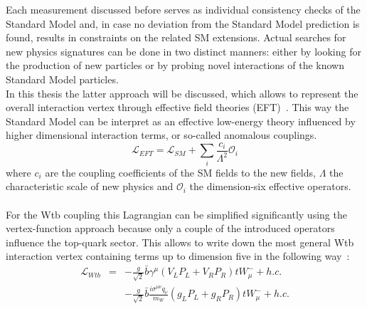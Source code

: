 Each measurement discussed before serves as individual consistency checks of the Standard Model and, in case no deviation from the Standard Model prediction is found, results in constraints on the related SM extensions.
Actual searches for new physics signatures can be done in two distinct manners: either by looking for the production of new particles or by probing novel interactions of the known Standard Model particles.
\\
In this thesis the latter approach will be discussed, which allows to represent the overall interaction vertex through effective field theories (EFT)~\cite{EFTOld}. This way the Standard Model can be interpret as an effective low-energy theory influenced by higher dimensional interaction terms, or so-called anomalous couplings.
\begin{equation}
 \mathcal{L}_{EFT} = \mathcal{L}_{SM} + \sum_{i} \frac{c_i}{\Lambda^{2}} \mathcal{O}_i
\end{equation}
where $c_i$ are the coupling coefficients of the SM fields to the new fields, $\Lambda$ the characteristic scale of new physics and $\mathcal{O}_i$ the dimension-six effective operators.
\\
\\
For the Wtb coupling this Lagrangian can be simplified significantly using the vertex-function approach because only a couple of the introduced operators influence the top-quark sector.
This allows to write down the most general Wtb interaction vertex containing terms up to dimension five in the following way~\cite{EFTLinkWithWtb, RecentWtbZhang}:
\begin{eqnarray} \label{eq::FullWtbLagr}
  \mathcal{L}_{Wtb} & = & - \frac{g}{\sqrt{2}} \bar{b} \gamma^{\mu} \left( V_L P_L + V_R P_R \right) t W_{\mu}^{-} + h.c. \nonumber \\
		    &   & - \frac{g}{\sqrt{2}} \bar{b} \frac{i\sigma^{\mu \nu} q_{\nu}}{m_{W}} \left( g_L P_L + g_R P_R \right) t W_{\mu}^{-} + h.c.
\end{eqnarray}
